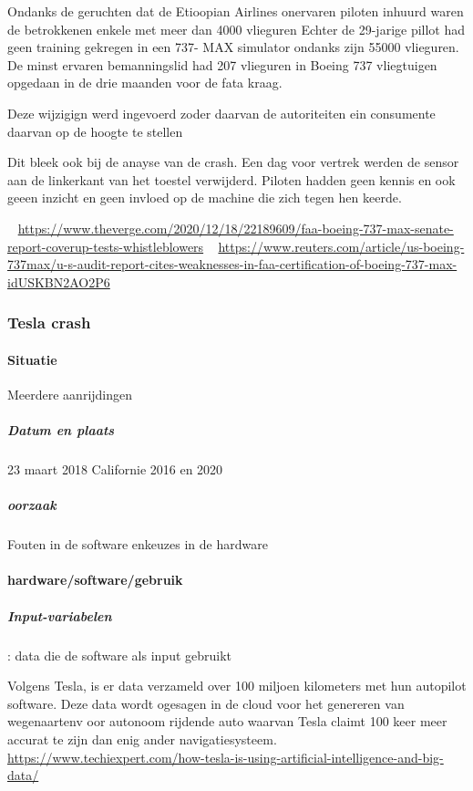 \documentclass{article}
\begin{document}
Ondanks de geruchten dat de Etioopian Airlines onervaren piloten inhuurd waren de betrokkenen enkele met meer dan 4000 vlieguren Echter de 29-jarige pillot  had geen training gekregen in een 737- MAX simulator ondanks zijn 55000 vlieguren. De minst ervaren bemanningslid had 207 vlieguren in Boeing 737 vliegtuigen opgedaan  in de drie maanden voor de fata kraag.

 Deze wijzigign werd ingevoerd zoder daarvan de autoriteiten ein consumente daarvan op de hoogte te stellen 

Dit bleek ook bij de anayse van de crash. Een dag voor vertrek werden de sensor aan de  linkerkant van het toestel verwijderd. Piloten hadden geen kennis en ook geeen inzicht en geen invloed op de machine die zich tegen hen keerde.

~\cite{737wistle}
\url{https://www.theverge.com/2020/12/18/22189609/faa-boeing-737-max-senate-report-coverup-tests-whistleblowers}
~\cite{reutersboeing}
\url{https://www.reuters.com/article/us-boeing-737max/u-s-audit-report-cites-weaknesses-in-faa-certification-of-boeing-737-max-idUSKBN2AO2P6}




\subsubsection{Tesla crash}









\paragraph{Situatie}
Meerdere aanrijdingen

\subparagraph{Datum en plaats}
23 maart 2018 Californie
2016 en 2020

\subparagraph{oorzaak}
Fouten in de software enkeuzes in de hardware


\paragraph{hardware/software/gebruik}


\subparagraph{Input-variabelen}: data die de software als input gebruikt


Volgens Tesla, is er data verzameld over 100 miljoen kilometers met hun autopilot software. Deze data wordt ogesagen in de cloud voor het genereren van wegenaartenv oor autonoom rijdende auto waarvan Tesla claimt 100 keer meer accurat te zijn dan enig ander navigatiesysteem.
~\cite{techiebigdata}
\url{https://www.techiexpert.com/how-tesla-is-using-artificial-intelligence-and-big-data/}
\end{document}
